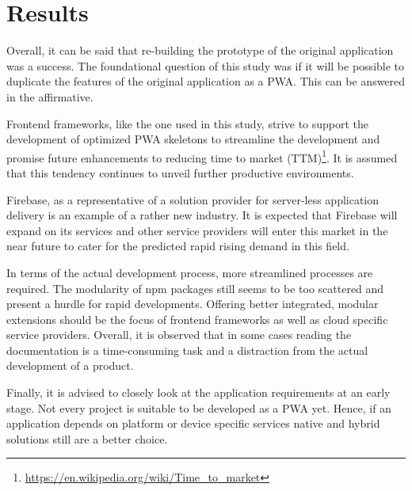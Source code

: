 \chapter{Results}

Overall, it can be said that re-building the prototype of the original application was a success. The foundational question of this study was if it will be possible to duplicate the features of the original application as a PWA. This can be answered in the affirmative.

Frontend frameworks, like the one used in this study, strive to support the development of optimized PWA skeletons to streamline the development and promise future enhancements to reducing time to market (TTM)\footnote{\url{https://en.wikipedia.org/wiki/Time_to_market}}. It is assumed that this tendency continues to unveil further productive environments.

Firebase, as a representative of a solution provider for server-less application delivery is an example of a rather new industry. It is expected that Firebase will expand on its services and other service providers will enter this market in the near future to cater for the predicted rapid rising demand in this field.

In terms of the actual development process, more streamlined processes are required. The modularity of npm packages still seems to be too scattered and present a hurdle for rapid developments. Offering better integrated, modular extensions should be the focus of frontend frameworks as well as cloud specific service providers. Overall, it is observed that in some cases reading the documentation is a time-consuming task and a distraction from the actual development of a product.

Finally, it is advised to closely look at the application requirements at an early stage. Not every project is suitable to be developed as a PWA yet. Hence, if an application depends on platform or device specific services native and hybrid solutions still are a better choice.
